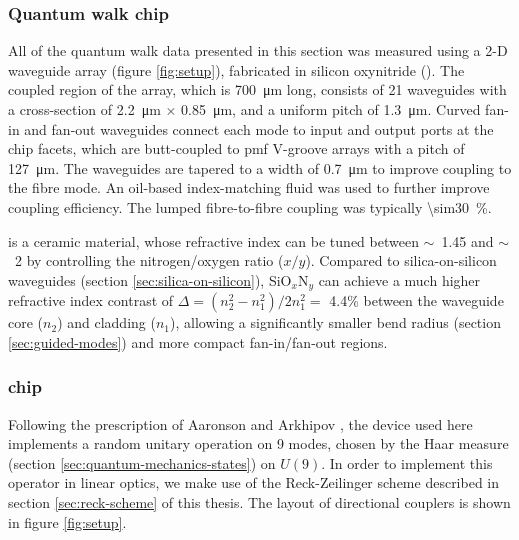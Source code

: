 \subsubsection{Quantum walk chip} 
\label{sec:quantum-walk-chip}
All of the quantum walk data presented in this section was measured using a 2-D waveguide array (figure \ref{fig:setup}), fabricated in silicon oxynitride (\sion). The coupled region of the array, which  is \SI{700}{\micro\metre} long, consists of 21 waveguides with a cross-section of \SI{2.2}{\micro\metre}  $\times$ \SI{0.85}{\micro\metre},  and a uniform pitch of \SI{1.3}{\micro\metre}. Curved fan-in and fan-out waveguides connect each mode to input and output ports at the chip facets, which are butt-coupled to \gls{pmf} V-groove arrays with a pitch of \SI{127}{\micro\metre}. The waveguides are tapered to a width of \SI{0.7}{\micro\metre} to improve coupling to the fibre mode. An oil-based index-matching fluid was used to further improve coupling efficiency. The lumped fibre-to-fibre coupling was typically \SI{\sim30}{\percent}.

\sion is a ceramic material, whose refractive index can be tuned between $\sim$~1.45 and $\sim$~2 by controlling the nitrogen/oxygen ratio ($x/y$). Compared to silica-on-silicon waveguides (section \ref{sec:silica-on-silicon}), SiO$_x$N$_y$ can achieve a much higher refractive index contrast of $\Delta = (n_2^2-n_1^2)/2n_1^2 =$ 4.4\% between the waveguide core ($n_2$) and cladding ($n_1$), allowing a significantly smaller bend radius (section \ref{sec:guided-modes}) and more compact fan-in/fan-out regions. 

\subsubsection{\bosonsampling chip} 
\newcommand{\sini}{Si$_2$N$_3$\xspace}
\label{sec:bosonsampling-chip}
Following the prescription of Aaronson and Arkhipov \cite{Aaronson2010}, the \bosonsampling device used here implements a random unitary operation on 9 modes, chosen by the Haar measure (section \ref{sec:quantum-mechanics-states}) on $U(9)$. In order to implement this operator in linear optics, we make use of the Reck-Zeilinger scheme described in section \ref{sec:reck-scheme} of this thesis.  The layout of directional couplers is shown in figure \ref{fig:setup}.  

